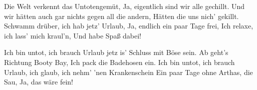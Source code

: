     \beginverse*
        Die Welt verkennt das Untotengem\"{u}t,
        Ja, eigentlich sind wir alle gechillt.
        Und wir h\"{a}tten auch gar nichts gegen all die andern,
        H\"{a}tten die uns nich' gekillt.
        Schwamm dr\"{u}ber, ich hab jetz' Urlaub,
        Ja, endlich ein paar Tage frei,
        Ich relaxe, ich lass' mich kraul'n,
        Und habe Spa\ss{} dabei!
    \endverse

    \beginchorus
        Ich bin untot, ich brauch Urlaub
        jetz is' Schluss mit B\"{o}se sein.
        Ab geht's Richtung Booty Bay,
        Ich pack die Badehosen ein.
        Ich bin untot, ich brauch Urlaub,
        ich glaub, ich nehm' 'nen Krankenschein
        Ein paar Tage ohne Arthas, die Sau,
        Ja, das w\"{a}re fein!
    \endchorus
\endsong
